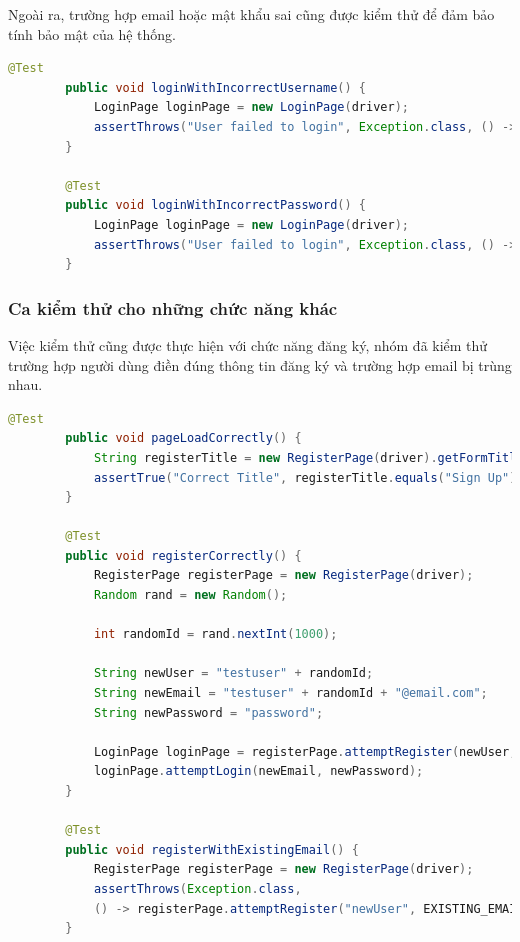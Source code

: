\documentclass[./../main_file.tex]{subfiles}
\begin{document}
	Ngoài ra, trường hợp email hoặc mật khẩu sai cũng được kiểm thử để đảm bảo tính bảo mật của hệ thống.
	
	\begin{lstlisting}[language=Java,caption=Ca kiểm thử sai thông tin đăng nhập]
		@Test
		public void loginWithIncorrectUsername() {
			LoginPage loginPage = new LoginPage(driver);
			assertThrows("User failed to login", Exception.class, () -> loginPage.attemptLogin(WRONG_EMAIL, PASSWORD));
		}
		
		@Test
		public void loginWithIncorrectPassword() {
			LoginPage loginPage = new LoginPage(driver);
			assertThrows("User failed to login", Exception.class, () -> loginPage.attemptLogin(EMAIL, WRONG_PASSWORD));
		}
	\end{lstlisting}
	
	\subsubsection{Ca kiểm thử cho những chức năng khác}
	
	Việc kiểm thử cũng được thực hiện với chức năng đăng ký, nhóm đã kiểm thử trường hợp người dùng điền đúng thông tin đăng ký và trường hợp email bị trùng nhau.
	
	\begin{lstlisting}[language=Java,caption=Ca kiểm thử chức năng đăng ký]
		@Test
		public void pageLoadCorrectly() {
			String registerTitle = new RegisterPage(driver).getFormTitle();
			assertTrue("Correct Title", registerTitle.equals("Sign Up"));
		}
		
		@Test
		public void registerCorrectly() {
			RegisterPage registerPage = new RegisterPage(driver);
			Random rand = new Random();
			
			int randomId = rand.nextInt(1000);
			
			String newUser = "testuser" + randomId;
			String newEmail = "testuser" + randomId + "@email.com";
			String newPassword = "password";
			
			LoginPage loginPage = registerPage.attemptRegister(newUser, newEmail, newPassword, newPassword);
			loginPage.attemptLogin(newEmail, newPassword);
		}
		
		@Test
		public void registerWithExistingEmail() {
			RegisterPage registerPage = new RegisterPage(driver);
			assertThrows(Exception.class,
			() -> registerPage.attemptRegister("newUser", EXISTING_EMAIL, "password", "password"));
		}
	\end{lstlisting}
\end{document}
